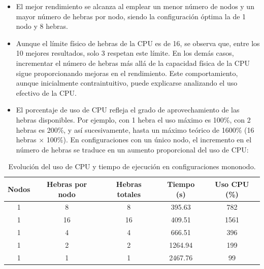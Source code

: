 \begin{itemize}
    \item El mejor rendimiento se alcanza al emplear un menor número de nodos y un mayor número de hebras por nodo, siendo la configuración óptima la de 1 nodo y 8 hebras.
    \item Aunque el límite físico de hebras de la CPU es de 16, se observa que, entre los 10 mejores resultados, solo 3 respetan este límite. En los demás casos, incrementar el número de hebras más allá de la capacidad física de la CPU sigue proporcionando mejoras en el rendimiento. Este comportamiento, aunque inicialmente contraintuitivo, puede explicarse analizando el uso efectivo de la CPU.
    \item El porcentaje de uso de CPU refleja el grado de aprovechamiento de las hebras disponibles. Por ejemplo, con 1 hebra el uso máximo es 100\%, con 2 hebras es 200\%, y así sucesivamente, hasta un máximo teórico de 1600\% (16 hebras $\times$ 100\%). En configuraciones con un único nodo, el incremento en el número de hebras se traduce en un aumento proporcional del uso de CPU:
\end{itemize}

\begin{table}[ht]
    \centering
    \begin{tabular}{|c|c|c|c|c|}
        \hline
        \textbf{Nodos} & \textbf{Hebras por nodo} & \textbf{Hebras totales} & \textbf{Tiempo (s)} & \textbf{Uso CPU (\%)} \\
        \hline
        1              & 8                        & 8                       & 395.63              & 782                   \\
        1              & 16                       & 16                      & 409.51              & 1561                  \\
        1              & 4                        & 4                       & 666.51              & 396                   \\
        1              & 2                        & 2                       & 1264.94             & 199                   \\
        1              & 1                        & 1                       & 2467.76             & 99                    \\
        \hline
    \end{tabular}
    \caption{Evolución del uso de CPU y tiempo de ejecución en configuraciones mononodo.}
\end{table}

